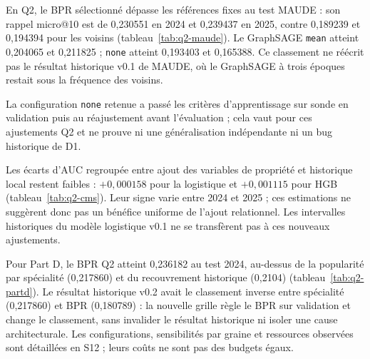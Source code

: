 En Q2, le BPR sélectionné dépasse les références fixes au test MAUDE : son rappel micro@10 est de 0,230551 en 2024 et 0,239437 en 2025, contre 0,189239 et 0,194394 pour les voisins (tableau~\ref{tab:q2-maude}). Le GraphSAGE \texttt{mean} atteint 0,204065 et 0,211825 ; \texttt{none} atteint 0,193403 et 0,165388. Ce classement ne réécrit pas le résultat historique v0.1 de MAUDE, où le GraphSAGE à trois époques restait sous la fréquence des voisins.

La configuration \texttt{none} retenue a passé les critères d'apprentissage sur sonde en validation puis au réajustement avant l'évaluation ; cela vaut pour ces ajustements Q2 et ne prouve ni une généralisation indépendante ni un bug historique de D1.

\begin{table}[!htbp]
\centering\small
\caption{Comparaison Q2 sur les inspections CMS des maisons de retraite : configurations sélectionnées selon l'AUC ROC de validation 2023, puis résultats des tests 2024, 2025 et regroupé. Les modèles à historique local et à ajout de variables de propriété sont appariés par famille ; les différences sont descriptives et aucun nouvel intervalle n'est calculé.}
\label{tab:q2-cms}

\end{table}

Les écarts d'AUC regroupée entre ajout des variables de propriété et historique local restent faibles : $+0,000158$ pour la logistique et $+0,001115$ pour HGB (tableau~\ref{tab:q2-cms}). Leur signe varie entre 2024 et 2025 ; ces estimations ne suggèrent donc pas un bénéfice uniforme de l'ajout relationnel. Les intervalles historiques du modèle logistique v0.1 ne se transfèrent pas à ces nouveaux ajustements.

\begin{table}[!htbp]
\centering\small
\caption{Comparaison Q2 sur Medicare Part D : configurations sélectionnées sur validation 2023 et rappel micro@10 au test 2024. Le rappel a pour dénominateur tous les liens positifs observables ; les 2\,000 prescripteurs admissibles, y compris ceux sans positif, sont conservés dans la cohorte. Aucun échantillonnage de candidats ni nouvel intervalle n'est utilisé.}
\label{tab:q2-partd}

\end{table}

Pour Part D, le BPR Q2 atteint 0,236182 au test 2024, au-dessus de la popularité par spécialité (0,217860) et du recouvrement historique (0,2104) (tableau~\ref{tab:q2-partd}). Le résultat historique v0.2 avait le classement inverse entre spécialité (0,217860) et BPR (0,180789) : la nouvelle grille règle le BPR sur validation et change le classement, sans invalider le résultat historique ni isoler une cause architecturale. Les configurations, sensibilités par graine et ressources observées sont détaillées en S12 ; leurs coûts ne sont pas des budgets égaux.

